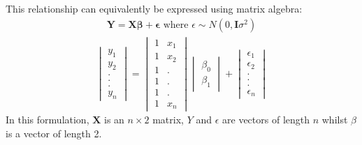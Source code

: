 \documentclass[letterpaper,10pt,english]{jupyterBook}
\begin{document}
\sphinxAtStartPar
This relationship can equivalently be expressed using matrix algebra:
\begin{equation*}
\begin{split}
\mathbf{Y}=\mathbf{X}\mathbf{\beta}+\mathbf{\epsilon} \text{ where }\epsilon \sim N(0,\mathbf{I}\sigma^2)
\end{split}
\end{equation*}\begin{equation*}
\begin{split}
\begin{vmatrix}y_1\\y_2 \\. \\. \\. \\y_n \end{vmatrix}=\begin{vmatrix}1 & x_1 \\ 1 & x_2 \\1 & . \\1 & .  \\ 1& . \\1 & x_n \end{vmatrix}\begin{vmatrix} \beta_0 \\ \beta_1 \end{vmatrix}+\begin{vmatrix}\epsilon_1\\ \epsilon_2 \\ . \\ . \\. \\ \epsilon_n \end{vmatrix} 
\end{split}
\end{equation*}
\sphinxAtStartPar
In this formulation, \(\mathbf{X}\) is an \(n \times 2\) matrix, \(Y\) and \(\epsilon\) are vectors of length \(n\) whilst \(\beta\) is a vector of length 2.
\end{document}
